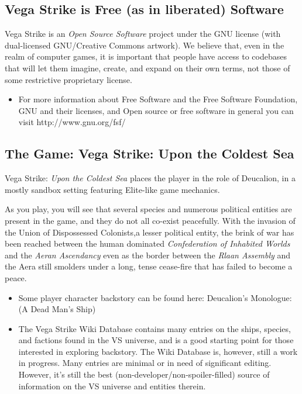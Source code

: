 \documentclass{article}
\begin{document}
\subsection{Vega Strike is Free (as in liberated) Software}

Vega Strike is an \textit{Open Source Software} project under the GNU license (with dual-licensed GNU/Creative Commons artwork). We believe that, even in the realm of computer games, it is important that people have access to codebases that will let them imagine, create, and expand on their own terms, not those of some restrictive proprietary license. 

\begin{itemize}
\item  For more information about Free Software and the Free Software Foundation, GNU and their licenses, and Open source or free software in general you can visit http://www.gnu.org/fsf/ 
\end{itemize}


\subsection{The Game: Vega Strike: Upon the Coldest Sea}

Vega Strike: \textit{Upon the Coldest Sea} places the player in the role of Deucalion, in a mostly sandbox setting featuring Elite-like game mechanics.

As you play, you will see that several species and numerous political entities are present in the game, and they do not all co-exist peacefully. With the invasion of the Union of Dispossessed Colonists,a lesser political entity, the brink of war has been reached between the human dominated \textit{Confederation of Inhabited Worlds} and the \textit{Aeran Ascendancy} even as the border between the \textit{Rlaan Assembly} and the Aera still smolders under a long, tense cease-fire that has failed to become a peace. 

\begin{itemize}
\item  Some player character backstory can be found here: Deucalion's Monologue: (A Dead Man's Ship)
\item  The Vega Strike Wiki Database contains many entries on the ships, species, and factions found in the VS universe, and is a good starting point for those interested in exploring backstory. The Wiki Database is, however, still a work in progress. Many entries are minimal or in need of significant editing. However, it's still the best (non-developer/non-spoiler-filled) source of information on the VS universe and entities therein.
\end{itemize}
\end{document}
